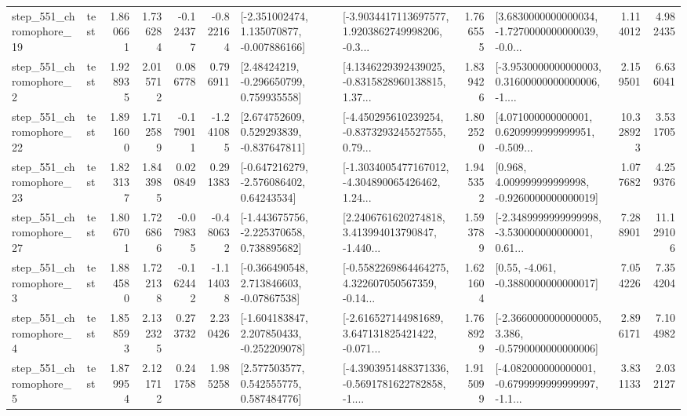 \begin{tabular}{llrrrrllrlrr}
  step\_551\_chromophore\_19 &      test &      1.860661 &    1.736284 &     -0.124377 & -0.822164 &   [-2.351002474, 1.135070877, -0.007886166] &  [-3.9034417113697577, 1.9203862749998206, -0.3... &       1.766555 &  [3.6830000000000034, -1.7270000000000039, -0.0... &            1.114012 &          4.982435 \\
   step\_551\_chromophore\_2 &      test &      1.928935 &    2.015712 &      0.086778 &  0.796911 &     [2.48424219, -0.296650799, 0.759935558] &  [4.1346229392439025, -0.8315828960138815, 1.37... &       1.839426 &  [-3.9530000000000003, 0.31600000000000006, -1.... &            2.159501 &          6.636041 \\
  step\_551\_chromophore\_22 &      test &      1.891600 &    1.712589 &     -0.179011 & -1.241085 &    [2.674752609, 0.529293839, -0.837647811] &  [-4.450295610239254, -0.8373293245527555, 0.79... &       1.802520 &  [4.071000000000001, 0.6209999999999951, -0.509... &           10.328923 &          3.531705 \\
  step\_551\_chromophore\_23 &      test &      1.823137 &    1.843985 &      0.020849 &  0.291383 &    [-0.647216279, -2.576086402, 0.64243534] &  [-1.3034005477167012, -4.304890065426462, 1.24... &       1.945352 &    [0.968, 4.009999999999998, -0.9260000000000019] &            1.077682 &          4.259376 \\
  step\_551\_chromophore\_27 &      test &      1.806701 &    1.726866 &     -0.079835 & -0.480632 &   [-1.443675756, -2.225370658, 0.738895682] &  [2.2406761620274818, 3.413994013790847, -1.440... &       1.593789 &  [-2.3489999999999998, -3.530000000000001, 0.61... &            7.288901 &         11.129106 \\
   step\_551\_chromophore\_3 &      test &      1.884580 &    1.722138 &     -0.162442 & -1.114038 &    [-0.366490548, 2.713846603, -0.07867538] &  [-0.5582269864464275, 4.322607050567359, -0.14... &       1.621604 &                [0.55, -4.061, -0.3880000000000017] &            7.054226 &          7.354204 \\
   step\_551\_chromophore\_4 &      test &      1.858593 &    2.132325 &      0.273732 &  2.230426 &   [-1.604183847, 2.207850433, -0.252209078] &  [-2.616527144981689, 3.647131825421422, -0.071... &       1.768929 &  [-2.3660000000000005, 3.386, -0.5790000000000006] &            2.896171 &          7.104982 \\
   step\_551\_chromophore\_5 &      test &      1.879954 &    2.121712 &      0.241758 &  1.985258 &     [2.577503577, 0.542555775, 0.587484776] &  [-4.3903951488371336, -0.5691781622782858, -1.... &       1.915099 &  [-4.082000000000001, -0.6799999999999997, -1.1... &            3.831133 &          2.032127 \\

\end{tabular}
